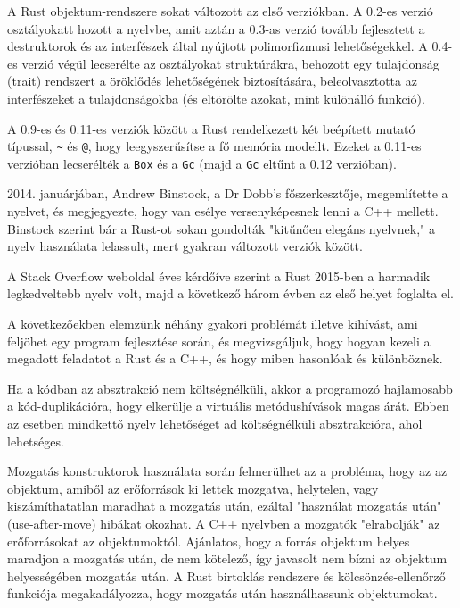 A Rust objektum-rendszere sokat változott az első verziókban. A 0.2-es verzió osztályokatt hozott a nyelvbe, amit aztán a 0.3-as verzió tovább fejlesztett a destruktorok és az interfészek által nyújtott polimorfizmusi lehetőségekkel.
A 0.4-es verzió végül lecserélte az osztályokat struktúrákra, behozott egy tulajdonság (trait) rendszert a öröklődés lehetőségének biztosítására, 
beleolvasztotta az interfészeket a tulajdonságokba (és eltörölte azokat, mint különálló funkció).\cite{rust:version_history}

A 0.9-es és 0.11-es verziók között a Rust rendelkezett két beépített mutató típussal, \texttt{\~} és \texttt{@}, hogy leegyszerűsítse a fő memória modellt.
Ezeket a 0.11-es verzióban lecserélték a \texttt{Box} és a \texttt{Gc} (majd a \texttt{Gc} eltűnt a 0.12 verzióban).\cite{rust:version_history}

2014. januárjában, Andrew Binstock, a Dr Dobb's főszerkesztője, megemlítette a nyelvet, és megjegyezte, hogy van esélye versenyképesnek lenni a C++ mellett.
Binstock szerint bár a Rust-ot sokan gondolták "kitűnően elegáns nyelvnek," a nyelv használata lelassult, mert gyakran változott verziók között.\cite{dr_dobb}

A Stack Overflow weboldal éves kérdőíve szerint a Rust 2015-ben a harmadik legkedveltebb nyelv volt, majd a következő három évben az első helyet foglalta el.\cite{so_2015, so_2016, so_2017, so_2018}


A következőekben elemzünk néhány gyakori problémát illetve kihívást, ami feljöhet egy program fejlesztése során,
és megvizsgáljuk, hogy hogyan kezeli a megadott feladatot a Rust és a C++, és hogy miben hasonlóak és különböznek.


Ha a kódban az absztrakció nem költségnélküli, akkor a programozó hajlamosabb a kód-duplikációra, hogy elkerülje a virtuális metódushívások magas árát.
Ebben az esetben mindkettő nyelv lehetőséget ad költségnélküli absztrakcióra, ahol lehetséges.\cite{compare:cpp:zerocost, compare:rust:zerocost}


Mozgatás konstruktorok használata során felmerülhet az a probléma, hogy az az objektum, amiből az erőforrások ki lettek mozgatva,
helytelen, vagy kiszámíthatatlan maradhat a mozgatás után, ezáltal "használat mozgatás után" (use-after-move) hibákat okozhat.
A C++ nyelvben a mozgatók "elrabolják" az erőforrásokat az objektumoktól. Ajánlatos, hogy a forrás objektum helyes maradjon a mozgatás után,
de nem kötelező, így javasolt nem bízni az objektum helyességében mozgatás után.\cite{compare:cpp:move_constructor}
A Rust birtoklás rendszere és kölcsönzés-ellenőrző funkciója megakadályozza, hogy mozgatás után használhassunk objektumokat.\cite{compare:rust:move_constructor}

